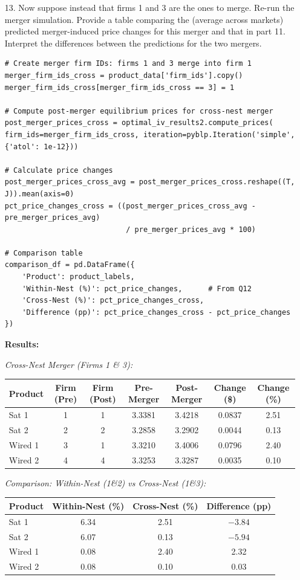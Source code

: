 \documentclass[english,11pt]{article}
\begin{document}
\begin{enumerate}
\item[13.] Now suppose instead that firms 1 and 3 are the ones to merge.
Re-run the merger simulation. Provide a table comparing the (average
across markets) predicted merger-induced price changes for this merger and
that in part 11. Interpret the differences between the predictions for the
two mergers.

\begin{verbatim}
# Create merger firm IDs: firms 1 and 3 merge into firm 1
merger_firm_ids_cross = product_data['firm_ids'].copy()
merger_firm_ids_cross[merger_firm_ids_cross == 3] = 1

# Compute post-merger equilibrium prices for cross-nest merger
post_merger_prices_cross = optimal_iv_results2.compute_prices(
firm_ids=merger_firm_ids_cross, iteration=pyblp.Iteration('simple', {'atol': 1e-12}))

# Calculate price changes
post_merger_prices_cross_avg = post_merger_prices_cross.reshape((T, J)).mean(axis=0)
pct_price_changes_cross = ((post_merger_prices_cross_avg - pre_merger_prices_avg) 
                            / pre_merger_prices_avg * 100)

# Comparison table
comparison_df = pd.DataFrame({
    'Product': product_labels,
    'Within-Nest (%)': pct_price_changes,      # From Q12
    'Cross-Nest (%)': pct_price_changes_cross,
    'Difference (pp)': pct_price_changes_cross - pct_price_changes
})
\end{verbatim}

\textbf{Results:}

\textit{Cross-Nest Merger (Firms 1 \& 3):}

\begin{center}
\begin{tabular}{lcccccc}
\hline
Product & Firm (Pre) & Firm (Post) & Pre-Merger & Post-Merger & Change (\$) & Change (\%) \\
\hline
Sat 1 & 1 & 1 & 3.3381 & 3.4218 & 0.0837 & 2.51 \\
Sat 2 & 2 & 2 & 3.2858 & 3.2902 & 0.0044 & 0.13 \\
Wired 1 & 3 & 1 & 3.3210 & 3.4006 & 0.0796 & 2.40 \\
Wired 2 & 4 & 4 & 3.3253 & 3.3287 & 0.0035 & 0.10 \\
\hline
\end{tabular}
\end{center}

\textit{Comparison: Within-Nest (1\&2) vs Cross-Nest (1\&3):}

\begin{center}
\begin{tabular}{lccc}
\hline
Product & Within-Nest (\%) & Cross-Nest (\%) & Difference (pp) \\
\hline
Sat 1 & 6.34 & 2.51 & $-3.84$ \\
Sat 2 & 6.07 & 0.13 & $-5.94$ \\
Wired 1 & 0.08 & 2.40 & 2.32 \\
Wired 2 & 0.08 & 0.10 & 0.03 \\
\hline
\end{tabular}
\end{center}


\end{enumerate}
\end{document}
